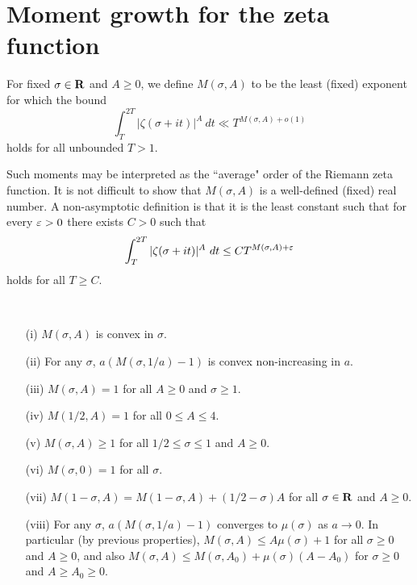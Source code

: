 \chapter{Moment growth for the zeta function}\label{zeta-moment-chapter}

\begin{definition}\label{zeta-moment-def}  For fixed $\sigma \in \mathbf{R}$ and $A \geq 0$, we define $M(\sigma,A)$ to be the least (fixed) exponent for which the bound
$$ \int_T^{2T} |\zeta(\sigma+it)|^A\ dt \ll T^{M(\sigma,A)+o(1)}$$
holds for all unbounded $T > 1$.
\end{definition}

Such moments may be interpreted as the ``average" order of the Riemann zeta function. It is not difficult to show that $M(\sigma,A)$ is a well-defined (fixed) real number.  A non-asymptotic definition is that it is the least constant such that for every $\varepsilon>0$ there exists $C>0$ such that
$$ \int_T^{2T} |\zeta(\sigma+it)|^A\ dt \leq C T^{M(\sigma,A)+\eps}$$
holds for all $T \geq C$.

\begin{lemma}\label{zeta-moment-basic}\
\begin{itemize}
\item[(i)] $M(\sigma,A)$ is convex in $\sigma$.
\item[(ii)] For any $\sigma$, $a (M(\sigma,1/a)-1)$ is convex non-increasing in $a$.
\item[(iii)] $M(\sigma,A)=1$ for all $A \geq 0$ and $\sigma \geq 1$.
\item[(iv)] $M(1/2,A)=1$ for all $0 \leq A \leq 4$.
\item[(v)] $M(\sigma,A) \geq 1$ for all $1/2 \leq \sigma \leq 1$ and $A \geq 0$.
\item[(vi)] $M(\sigma,0) = 1$ for all $\sigma$.
\item[(vii)] $M(1-\sigma,A) = M(1-\sigma,A) + (1/2-\sigma) A$ for all $\sigma \in \mathbf{R}$ and $A \geq 0$.
\item[(viii)] For any $\sigma$, $a(M(\sigma,1/a)-1)$ converges to $\mu(\sigma)$ as $a \to 0$.  In particular (by previous properties), $M(\sigma,A) \leq A \mu(\sigma) + 1$ for all $\sigma \geq 0$ and $A \geq 0$, and also $M(\sigma,A) \leq M(\sigma,A_0) + \mu(\sigma)(A-A_0)$ for $\sigma \geq 0$ and $A \geq A_0 \geq 0$.
\end{itemize}
\end{lemma}

